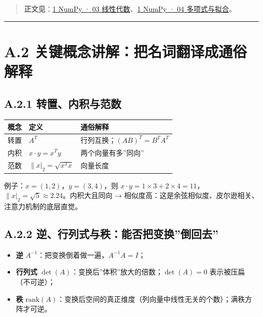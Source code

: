 \begin{quote}
\textbf{正文见}：\href{../../chapters/01-numpy/03-线性代数.md}{1 NumPy ·
03 线性代数}、\href{../../chapters/01-numpy/04-多项式与拟合.md}{1 NumPy
· 04 多项式与拟合}。
\end{quote}

\begin{center}\rule{0.5\linewidth}{0.5pt}\end{center}

\section{A.2
关键概念讲解：把名词翻译成通俗解释}\label{a.2-ux5173ux952eux6982ux5ff5ux8bb2ux89e3ux628aux540dux8bcdux7ffbux8bd1ux6210ux901aux4fd7ux89e3ux91ca}

\subsection{A.2.1
转置、内积与范数}\label{a.2.1-ux8f6cux7f6eux5185ux79efux4e0eux8303ux6570}

{\def\LTcaptype{none} %
\begin{longtable}[]{@{}lll@{}}
\toprule\noalign{}
概念 & 定义 & 通俗解释 \\
\midrule\noalign{}
\endhead
\bottomrule\noalign{}
\endlastfoot
转置 & \(A^T\) & 行列互换；\((AB)^T=B^TA^T\) \\
内积 & \(x\cdot y = x^Ty\) & 两个向量有多''同向'' \\
范数 & \(\|x|_2=\sqrt{x^Tx}\) & 向量长度 \\
\end{longtable}
}

例子：\(x=(1,2)\)，\(y=(3,4)\)，则
\(x\cdot y = 1\times 3+2\times 4 = 11\)，\(\|x|_2=\sqrt{5}\approx 2.24\)。内积大且同向
→ 相似度高：这是余弦相似度、皮尔逊相关、注意力机制的底层直觉。

\subsection{A.2.2
逆、行列式与秩：能否把变换''倒回去''}\label{a.2.2-ux9006ux884cux5217ux5f0fux4e0eux79e9ux80fdux5426ux628aux53d8ux6362ux5012ux56deux53bb}

\begin{itemize}
\tightlist
\item
  \textbf{逆} \(A^{-1}\)：把变换倒着做一遍，\(A^{-1}A=I\)；
\item
  \textbf{行列式} \(\det(A)\)：变换后''体积''放大的倍数；\(\det(A)=0\)
  表示被压扁（不可逆）；
\item
  \textbf{秩}
  \(\mathrm{rank}(A)\)：变换后空间的真正维度（列向量中线性无关的个数）；满秩方阵才可逆。
\end{itemize}

